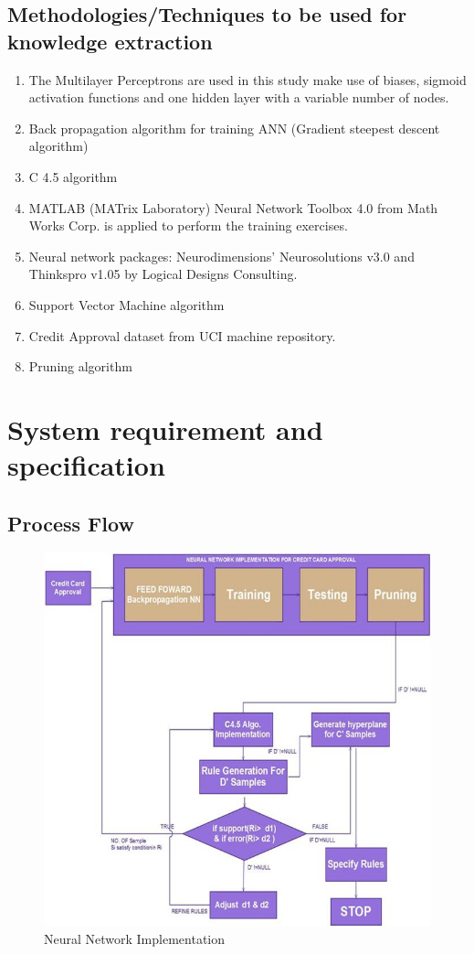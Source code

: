 \documentclass[a4paper,14pt,onecolumn]{article}
\begin{document}
\subsection{Methodologies/Techniques to be used for knowledge extraction}
\begin{enumerate}
\item The Multilayer Perceptrons are used in this study make use of biases, sigmoid       activation functions and one hidden layer with a variable number of nodes.
\item Back propagation algorithm for training ANN (Gradient steepest descent algorithm)
\item C 4.5 algorithm
\item MATLAB (MATrix Laboratory) Neural Network Toolbox 4.0 from Math Works Corp. is applied to perform the training exercises. 
\item Neural network packages: Neurodimensions’ Neurosolutions v3.0 and Thinkspro v1.05 by Logical Designs Consulting.
\item Support  Vector Machine algorithm
\item Credit Approval dataset from UCI machine repository.
\item Pruning algorithm
\end{enumerate}

\newpage
\section{System requirement and specification}

\subsection{Process Flow}
\begin{figure}
\begin{center}
\includegraphics[scale=0.5mm]
{blockdiagram.jpg} 
\caption{Neural Network Implementation}
\end{center}
\end{figure}
\end{document}
